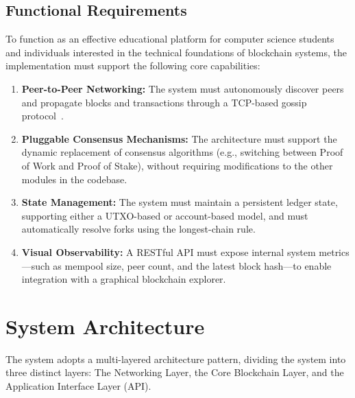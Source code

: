 \subsection{Functional Requirements}

To function as an effective educational platform for computer science students and individuals interested in the technical foundations of blockchain systems, the implementation must support the following core capabilities:

\begin{enumerate}
    \item \textbf{Peer-to-Peer Networking:}  
    The system must autonomously discover peers and propagate blocks and transactions through a TCP-based gossip protocol~\cite{coulouris2011distributed}.

    \item \textbf{Pluggable Consensus Mechanisms:}  
    The architecture must support the dynamic replacement of consensus algorithms (e.g., switching between Proof of Work and Proof of Stake), without requiring modifications to the other modules in the codebase.

    \item \textbf{State Management:}  
    The system must maintain a persistent ledger state, supporting either a UTXO-based or account-based model, and must automatically resolve forks using the longest-chain rule.

    \item \textbf{Visual Observability:}  
    A RESTful API must expose internal system metrics—such as mempool size, peer count, and the latest block hash—to enable integration with a graphical blockchain explorer.
\end{enumerate}


\section{System Architecture} \label{ch3_architecture}

The system adopts a multi-layered architecture pattern, dividing the system into three distinct layers: The Networking Layer, the Core Blockchain Layer, and the Application Interface Layer (API).



